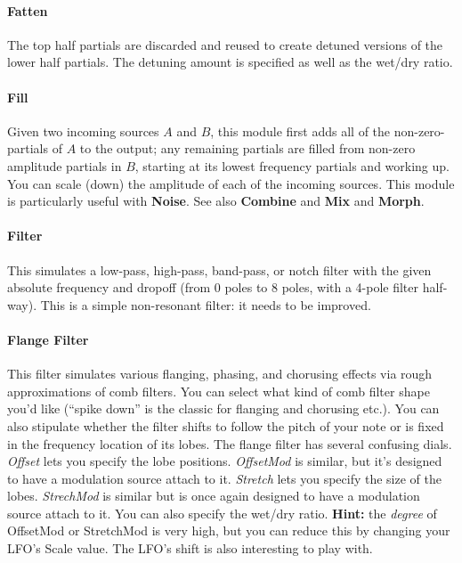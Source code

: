 \documentclass{article}
\begin{document}
\paragraph{Fatten}  The top half partials are discarded and reused to create detuned versions of the lower half partials.  The detuning amount is specified as well as the wet/dry ratio.

\paragraph{Fill}  Given two incoming sources \(A\) and \(B\), this module first adds all of the non-zero-partials of \(A\) to the output; any remaining partials are filled from non-zero amplitude partials in \(B\), starting at its lowest frequency partials and working up.  You can scale (down) the amplitude of each of the incoming sources.  This module is particularly useful with {\bf Noise}.  See also {\bf Combine} and {\bf Mix} and {\bf Morph}.

\paragraph{Filter}  This simulates a low-pass, high-pass, band-pass, or notch filter with the given absolute frequency and dropoff (from 0 poles to 8 poles, with a 4-pole filter half-way).  This is a simple non-resonant filter: it needs to be improved.



\paragraph{Flange Filter} This filter simulates various flanging, phasing, and chorusing effects via rough approximations of comb filters.  You can select what kind of comb filter shape you'd like (``spike down'' is the classic for flanging and chorusing etc.).    You can also stipulate whether the filter shifts to follow the pitch of your note or is fixed in the frequency location of its lobes.    The flange filter has several confusing dials.  {\it Offset} lets you specify the lobe positions.  {\it OffsetMod} is similar, but it's designed to have a modulation source attach to it.  {\it Stretch} lets you specify the size of the lobes.  {\it StrechMod} is similar but is once again designed to have a modulation source attach to it.  You can also specify the wet/dry ratio. {\bf Hint:}  the {\it degree} of OffsetMod or StretchMod is very high, but you can reduce this by changing your LFO's Scale value.  The LFO's shift is also interesting to play with.
\end{document}
